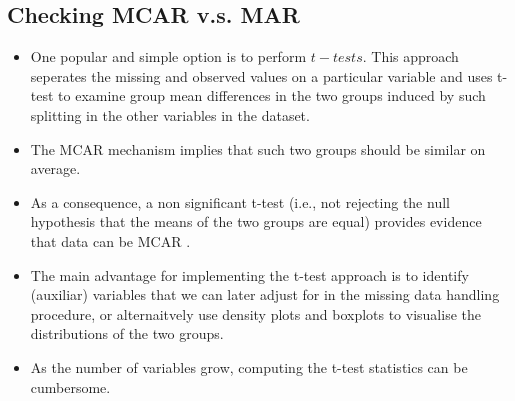 \documentclass[11pt]{article}
\theoremstyle{break}
\begin{document}
\subsection{Checking MCAR v.s. MAR}
\begin{itemize}
    \item One popular and simple option is to perform $t-tests$. This approach
        seperates the missing and observed values on a particular variable
        and uses t-test to examine group mean differences in the two groups
        induced by such splitting in the other variables in the dataset.
\item The MCAR mechanism implies that such two groups should be similar on average.
\item As a consequence, a non significant t-test (i.e., not rejecting the null hypothesis that the
means of the two groups are equal) provides evidence that data can be MCAR .
\item The main advantage for implementing the t-test approach is to identify (auxiliar) variables
that we can later adjust for in the missing data handling procedure, or
alternaitvely use density plots and boxplots to visualise the
distributions of the two groups.
\item As the number of variables grow, computing the t-test statistics can be
    cumbersome.
\end{itemize}
\end{document}
